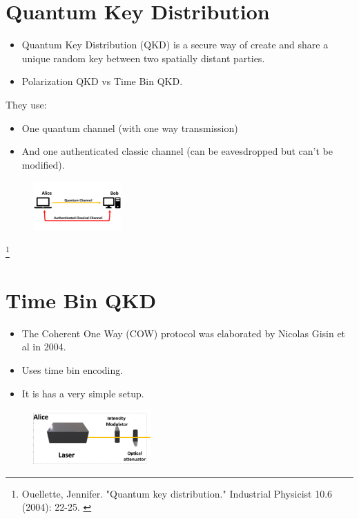 \documentclass[1000pt]{article}
\newcommand{\mysection}[1]{\section*{\color{black}\sffamily #1}}%
\newcommand{\cref}[1]{{\fontsize{17pt}{0cm}\selectfont\color{black} #1}}%
\newcommand\blfootnote[1]{%
  \begingroup
  \renewcommand\thefootnote{}\footnote{#1}%
  \addtocounter{footnote}{-1}%
  \endgroup
}
\begin{document}
\mysection{\Huge\textbf{ Quantum Key Distribution}} \Large \vspace*{1cm}
\begin{itemize}
\item Quantum Key Distribution (QKD) is a secure way of create and share a unique random key between two spatially distant parties. 
\item Polarization QKD vs Time Bin QKD.
\end{itemize}
They use:
\begin{itemize}
\item One quantum channel (with one way transmission)
\item And one authenticated classic channel (can be eavesdropped but can't be modified).
\end{itemize}
  \begin{figure}[hbt]
    	\centering
    	\includegraphics[width=0.3\textwidth]{./figures/Full.pdf}
    \end{figure}
    
    
\blfootnote{
\hspace*{12cm}
\begin{minipage}{26cm}
\cref{
Ouellette, Jennifer. "Quantum key distribution." Industrial Physicist 10.6 (2004): 22-25.
}
\end{minipage}

}
\mysection{\Huge\textbf{Time Bin QKD}} \Large \vspace*{1cm}
\begin{itemize}

\item The Coherent One Way (COW) protocol was elaborated by Nicolas Gisin et al in 2004. 

\item Uses time bin encoding.

\item It is has a very simple setup.
\end{itemize}
    \begin{figure}[hbt]
    	\centering
    	\includegraphics[width=0.4\textwidth]{./figures/A.pdf}
        	\label{bob}
    \end{figure}
    
\end{document}
